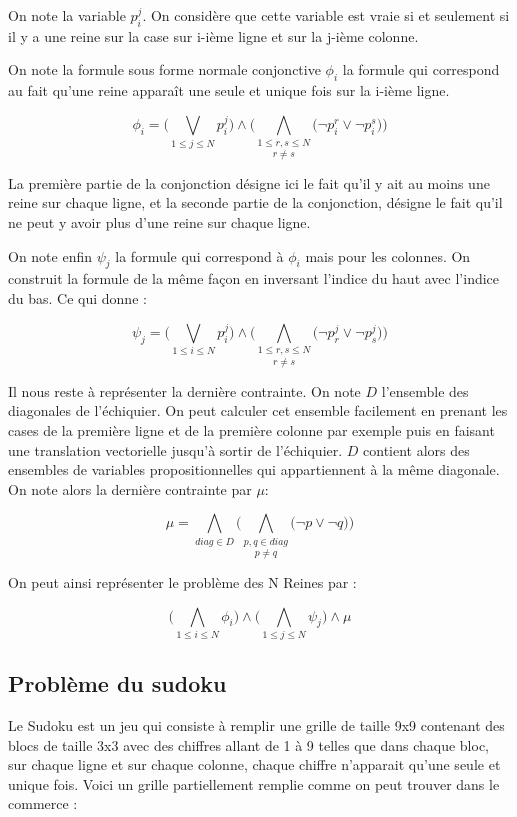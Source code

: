 \documentclass[12pt]{extarticle}
\begin{document}
On note la variable $p_i^j$. On considère que cette variable est vraie si et seulement si il y a une reine sur la case sur i-ième ligne et sur la j-ième colonne.

On note la formule sous forme normale conjonctive $\phi_i$ la formule qui correspond au fait qu'une reine apparaît une seule et unique fois sur la i-ième ligne.

$$ \phi_i = \Big( \bigvee_{1 \leq j \leq N} p_i^j \Big) \land \Big( \underset{r \neq s}{\bigwedge_{1 \leq r, s \leq N}} \big( \lnot{p_i^r} \lor \lnot{p_i^s} \big) \Big) $$

La première partie de la conjonction désigne ici le fait qu'il y ait au moins une reine sur chaque ligne, et la seconde partie de la conjonction, désigne le fait qu'il ne peut y avoir plus d'une reine sur chaque ligne.

On note enfin $\psi_j$ la formule qui correspond à $\phi_i$ mais pour les colonnes. On construit la formule de la même façon en inversant l'indice du haut avec l'indice du bas. Ce qui donne :

$$ \psi_j = \Big( \bigvee_{1 \leq i \leq N} p_i^j \Big) \land \Big( \underset{r \neq s}{\bigwedge_{1 \leq r, s \leq N}} \big( \lnot{p_r^j} \lor \lnot{p_s^j} \big) \Big) $$

Il nous reste à représenter la dernière contrainte. On note $D$ l'ensemble des diagonales de l'échiquier. On peut calculer cet ensemble facilement en prenant les cases de la première ligne et de la première colonne par exemple puis en faisant une translation vectorielle jusqu'à sortir de l'échiquier. $D$ contient alors des ensembles de variables propositionnelles qui appartiennent à la même diagonale. On note alors la dernière contrainte par $\mu$:

$$ \mu = \bigwedge_{diag \in D} \Big( \underset{p \neq q}{\bigwedge_{p, q \in diag}} \big( \lnot{p} \lor \lnot{q} \big) \Big) $$

On peut ainsi représenter le problème des N Reines par :

$$ \Big( \bigwedge_{1 \leq i \leq N} \phi_i \Big) \land \Big( \bigwedge_{1 \leq j \leq N} \psi_j \Big) \land \mu $$

\subsection{Problème du sudoku}

Le Sudoku est un jeu qui consiste à remplir une grille de taille 9x9 contenant des blocs de taille 3x3 avec des chiffres allant de 1 à 9 telles que dans chaque bloc, sur chaque ligne et sur chaque colonne, chaque chiffre n'apparait qu'une seule et unique fois. Voici un grille partiellement remplie comme on peut trouver dans le commerce :
\end{document}
